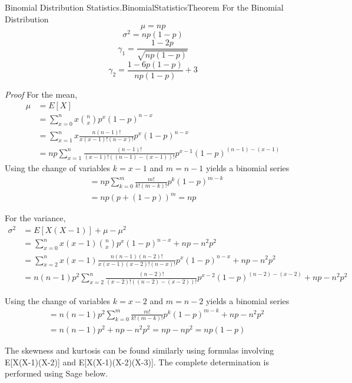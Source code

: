 \documentclass[10pt,]{book}
\makeatletter
\renewcommand*{\proofname}{Proof}
\renewenvironment{proof}[1][\proofname]{\par
  \pushQED{\qed}%
  \normalfont \topsep6\p@\@plus6\p@\relax
  \trivlist
  \item\relax
    {\itshape
    #1\@addpunct{.}}\hspace\labelsep\ignorespaces
}{%
  \popQED\endtrivlist\@endpefalse
}
\numberwithin{equation}{section}
\makeatother
\begin{document}
%
\par
\hypertarget{p-920}{}%
\begin{theorem}{Binomial Distribution Statistics.}{}{BinomialStatisticsTheorem}%
\hypertarget{BinomialStatistics}{}%
For the Binomial Distribution%
\begin{equation*}
\mu = np
\end{equation*}
%
\begin{equation*}
\sigma^2 = np(1-p)
\end{equation*}
%
\begin{equation*}
\gamma_1 = \frac{1-2p}{\sqrt{np(1-p)}}
\end{equation*}
%
\begin{equation*}
\gamma_2 = \frac{1-6p(1-p)}{np(1-p)} + 3
\end{equation*}
%
\end{theorem}
\begin{proof}\hypertarget{proof-42}{}
\hypertarget{p-922}{}%
For the mean,%
\begin{align*}
\mu & = E[X] \\
& = \sum_{x=0}^{n} {x \binom{n}{x} p^x (1-p)^{n-x}}\\
& = \sum_{x=1}^{n} {x \frac{n(n-1)!}{x(x-1)!(n-x)!} p^x (1-p)^{n-x}}\\
& = np \sum_{x=1}^{n} {\frac{(n-1)!}{(x-1)!((n-1)-(x-1))!} p^{x-1} (1-p)^{(n-1)-(x-1)}}
\end{align*}
Using the change of variables \(k=x-1\) and \(m = n-1\) yields a binomial series%
\begin{align*}
& = np \sum_{k=0}^{m} {\frac{m!}{k!(m-k)!} p^k (1-p)^{m-k}}\\
& = np (p + (1-p))^m = np
\end{align*}
%
\par
\hypertarget{p-923}{}%
For the variance,%
\begin{align*}
\sigma^2 & = E[X(X-1)] + \mu - \mu^2 \\
& = \sum_{x=0}^{n} {x(x-1) \binom{n}{x} p^x (1-p)^{n-x}} + np - n^2p^2\\
& = \sum_{x=2}^{n} {x(x-1) \frac{n(n-1)(n-2)!}{x(x-1)(x-2)!(n-x)!} p^x (1-p)^{n-x}}  + np - n^2p^2\\
& = n(n-1)p^2 \sum_{x=2}^{n} {\frac{(n-2)!}{(x-2)!((n-2)-(x-2))!} p^{x-2} (1-p)^{(n-2)-(x-2)}} + np - n^2p^2
\end{align*}
%
\par
\hypertarget{p-924}{}%
Using the change of variables \(k=x-2\) and \(m = n-2\) yields a binomial series%
\begin{align*}
& = n(n-1)p^2  \sum_{k=0}^{m} {\frac{m!}{k!(m-k)!} p^k (1-p)^{m-k}} + np - n^2p^2\\
& = n(n-1)p^2 + np - n^2p^2 = np - np^2 = np(1-p)
\end{align*}
%
\par
\hypertarget{p-925}{}%
The skewness and kurtosis can be found similarly using formulas involving E[X(X-1)(X-2)] and E[X(X-1)(X-2)(X-3)]. The complete determination is performed using Sage below.%
\end{proof}
\end{document}
